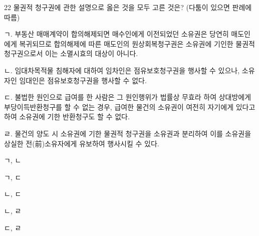 \begin{question}{22}
물권적 청구권에 관한 설명으로 옳은 것을 모두 고른 것은? (다툼이 있으면 판례에 따름)
\begin{framedtext}
ㄱ. 부동산 매매계약이 합의해제되면 매수인에게 이전되었던 소유권은 당연히 매도인에게 복귀되므로 합의해제에 따른 매도인의 원상회복청구권은 소유권에 기인한 물권적 청구권으로서 이는 소멸시효의 대상이 아니다. \par
ㄴ. 임대차목적물 침해자에 대하여 임차인은 점유보호청구권을 행사할 수 있으나, 소유자인 임대인은 점유보호청구권을 행사할 수 없다. \par
ㄷ. 불법한 원인으로 급여를 한 사람은 그 원인행위가 법률상 무효라 하여 상대방에게 부당이득반환청구를 할 수 없는 경우, 급여한 물건의 소유권이 여전히 자기에게 있다고 하여 소유권에 기한 반환청구도 할 수 없다. \par
ㄹ. 물건의 양도 시 소유권에 기한 물권적 청구권을 소유권과 분리하여 이를 소유권을 상실한 전(前)소유자에게 유보하여 행사시킬 수 있다.
\end{framedtext}
\begin{choices}
  \item ㄱ, ㄴ
  \item ㄱ, ㄷ
  \item ㄴ, ㄷ
  \item ㄴ, ㄹ
  \item ㄷ, ㄹ
\end{choices}
\end{question}
